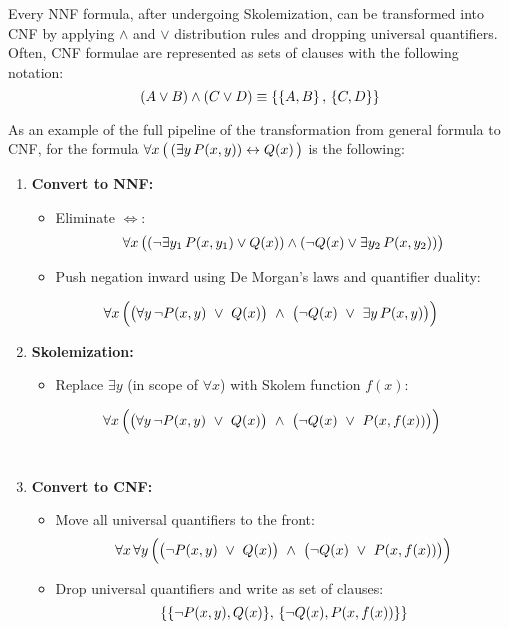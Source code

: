 Every NNF formula, after undergoing Skolemization, can be transformed into CNF by applying \(\land\) and \(\lor\) distribution rules and dropping universal quantifiers.
Often, CNF formulae are represented as sets of clauses with the following notation:
\[
(A \lor B) \land (C \lor D) \equiv \{\{A , B\} \, , \, \{C , D\}\}
\]

As an example of the full pipeline of the transformation from general formula to CNF, for the formula \( \forall x  \, \big( \, (\exists y  \,   P(x,y)) \leftrightarrow Q(x)  \,  \big)\)
is the following:
\begin{enumerate}
    \item \textbf{Convert to NNF:}
    \begin{itemize}
        \item Eliminate \(\iff\):
          \[\forall x  \, \big( (\neg \exists y_1 \,  P(x,y_1) \lor Q(x)) \land (\neg Q(x) \lor \exists y_2 \,  P(x,y_2))\big)\]
        \item Push negation inward using De Morgan's laws and quantifier duality:
    \end{itemize}
    \[
    \forall x \, \Big(\big(\forall y \, \neg P(x,y)\ \lor\ Q(x)\big)\ \land\ \big(\neg Q(x)\ \lor\ \exists y \,  P(x,y)\big)\Big)
    \]
    
    
    \item \textbf{Skolemization:}
    \begin{itemize}
        \item Replace \(\exists y\) (in scope of \(\forall x\)) with Skolem function \(f(x)\):
    \end{itemize}
    \[
      \forall x \ms \Big(\big(\forall y \ms \neg P(x,y)\ \lor\ Q(x)\big)\ \land\ \big(\neg Q(x)\ \lor\ P(x,f(x))\big)\Big)
    \]
    \\
    \item \textbf{Convert to CNF:}
    \begin{itemize}
    \item Move all universal quantifiers to the front:
    \[
      \forall x \ms  \forall y \ms  \Big(\big(\neg P(x,y)\ \lor\ Q(x)\big)\ \land\ \big(\neg Q(x)\ \lor\ P(x,f(x))\big)\Big)
    \]
    \item Drop universal quantifiers and write as set of clauses:
    \[
      \{\{\neg P(x,y), Q(x)\}, \,  \{\neg Q(x), P(x,f(x))\}\}
    \]
    \end{itemize}
    
\end{enumerate}

